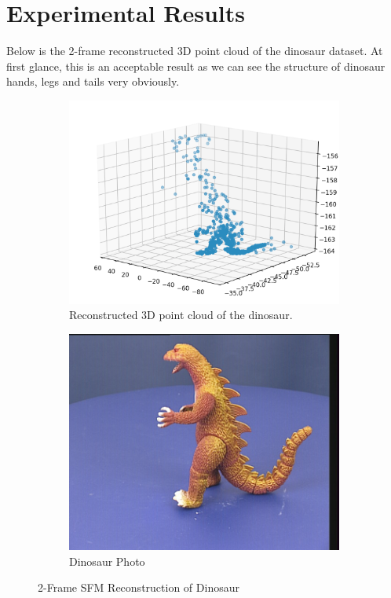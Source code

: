 \documentclass[10pt]{article}
\begin{document}
\newpage
\section*{Experimental Results}
Below is the 2-frame reconstructed 3D point cloud of the dinosaur dataset. At first glance, this is an acceptable result as we can see the structure of dinosaur hands, legs and tails very obviously.


\begin{figure}[h!]
  \centering
  \begin{subfigure}[h!]{0.7\linewidth}
    \includegraphics[width=\linewidth]{cloud.jpg}
    \caption{Reconstructed 3D point cloud of the dinosaur.}
  \end{subfigure}
  \begin{subfigure}[h!]{0.5\linewidth}
    \includegraphics[width=\linewidth]{original.jpg}
    \caption{Dinosaur Photo}
  \end{subfigure}
  \caption{2-Frame SFM Reconstruction of Dinosaur}
  \label{fig:coffee}
\end{figure}
\end{document}
